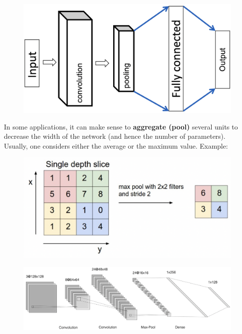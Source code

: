 \documentclass[a4paper]{extarticle}
\begin{document}
\begin{figure}[H]
    \includegraphics[width=15cm]{../images/IntroML_Fig7-4}
    \centering
\end{figure}

In some applications, it can make sense to \textbf{aggregate (pool)} several units to decrease the width of the network (and hence the number of parameters). Usually, one considers either the average or the maximum value. Example:

\begin{figure}[H]
    \includegraphics[width=13cm]{../images/IntroML_Fig7-5}
    \centering
\end{figure}

\begin{figure}[H]
    \includegraphics[width=15cm]{../images/IntroML_Fig7-6}
    \centering
\end{figure}
\end{document}
